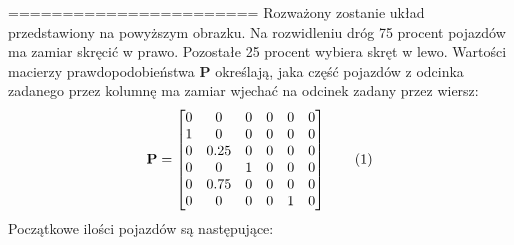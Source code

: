 \documentclass[12pt]{book}
\theoremstyle{plain}
\newcommand\cincludegraphics[2][]{\raisebox{-0.5\height}{\texttt{[image: \#2]}}}
\newcommand\addtag{\refstepcounter{equation}
\renewcommand{\labelenumii}{\theenumii}
\renewcommand{\theenumii}{\theenumi.\arabic{enumii}.}
\tag{\theequation}}
\begin{document}
======================= \newline
\def \xzero {\begin{bmatrix}
		7 \\ 4 \\ 3 \\ 0 \\ 1 \\ 5
\end{bmatrix}}
\def \A{
	\begin{bmatrix}
		0 & 0    & 0 & 0 & 0 & 0 \\
		1 & 0    & 0 & 0 & 0 & 0 \\
		0 & 0.25 & 0 & 0 & 0 & 0 \\
		0 & 0    & 1 & 0 & 0 & 0 \\
		0 & 0.75 & 0 & 0 & 0 & 0 \\
		0 & 0    & 0 & 0 & 1 & 0 
	\end{bmatrix}
}\newline \newline
Rozważony zostanie układ przedstawiony na powyższym obrazku. Na rozwidleniu dróg 75 procent pojazdów ma zamiar skręcić w prawo. Pozostałe 25 procent wybiera skręt w lewo. 
Wartości macierzy prawdopodobieństwa $\textbf{P}$ określają, jaka część pojazdów z odcinka zadanego przez kolumnę ma zamiar wjechać na odcinek zadany przez wiersz:
\def \Azero{
	\begin{bmatrix}
		\frac{4}{7} & 0    & 0 & 0 & 0 & 0 \\
		\frac{3}{7} & 0    & 0 & 0 & 0 & 0 \\
		0 & 0.25 & 0 & 0 & 0 & 0 \\
		0 & 0    & 1 & 0 & 0 & 0 \\
		0 & 0.75 & 0 & 0 & 0 & 0 \\
		0 & 0    & 0 & 0 & 1 & 0 
	\end{bmatrix}
} 
\def \P {\begin{bmatrix}
		0 & 0 & 0 & 0 & 0 & 0 \\
		1 & 0 & 0 & 0 & 0 & 0 \\
		0 & 0.25 & 0 & 0 & 0 & 0 \\
		0 & 0 & 1 & 0 & 0 & 0 \\
		0 & 0.75 & 0 & 0 & 0 & 0 \\
		0 & 0 & 0 & 0 & 1 & 0 
\end{bmatrix}}
\[\textbf{P}=\P \addtag \label{eq:p_example_ctm} \]
Początkowe ilości pojazdów są następujące:
\end{document}
